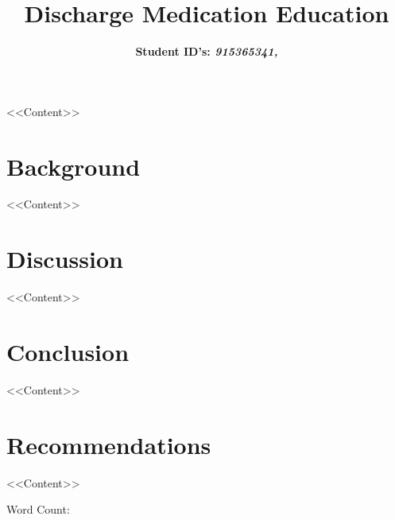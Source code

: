 \documentclass[british,12pt,a4paper]{article}
\title{{\fontsize{14}{15} \textbf{Discharge Medication Education}}\vspace{-1em}}
\author{{\fontsize{14}{15} \textbf{Student ID's: \textit{915365341, }}}}
\date{}
\begin{document}
	\maketitle
	\thispagestyle{fancy}
	<<Content>>
	\section{Background}
	<<Content>>
	\section{Discussion}
	<<Content>>
	\section{Conclusion}
	<<Content>>
	\section{Recommendations}
	<<Content>>
	\vfill
	\begin{center}
		\large Word Count: 
	\end{center}
	\pagebreak
	\doublespacing
	\printbibliography
	
\end{document}
